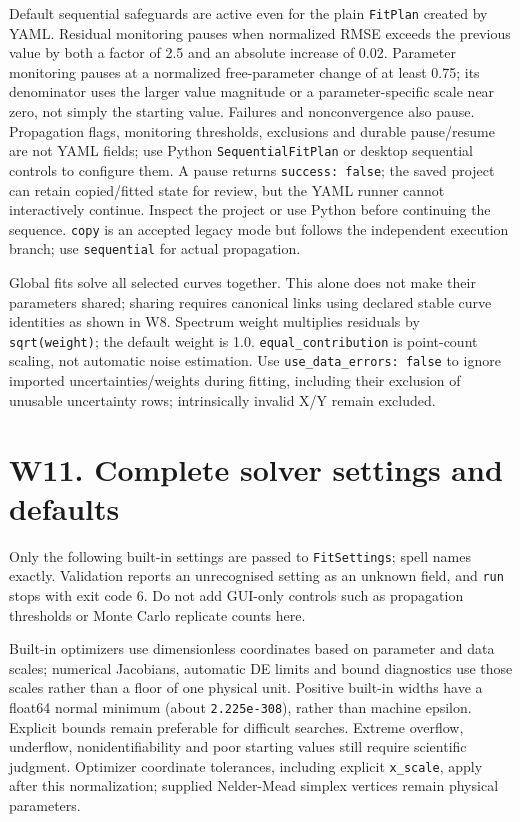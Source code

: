 \documentclass[
  10pt,
  a4paper,
  oneside]{scrreprt}
\begin{document}
Default sequential safeguards are active even for the plain
\texttt{FitPlan} created by YAML. Residual monitoring pauses when
normalized RMSE exceeds the previous value by both a factor of 2.5 and
an absolute increase of 0.02. Parameter monitoring pauses at a
normalized free-parameter change of at least 0.75; its denominator uses
the larger value magnitude or a parameter-specific scale near zero, not
simply the starting value. Failures and nonconvergence also pause.
Propagation flags, monitoring thresholds, exclusions and durable
pause/resume are not YAML fields; use Python \texttt{SequentialFitPlan}
or desktop sequential controls to configure them. A pause returns
\texttt{success:\ false}; the saved project can retain copied/fitted
state for review, but the YAML runner cannot interactively continue.
Inspect the project or use Python before continuing the sequence.
\texttt{copy} is an accepted legacy mode but follows the independent
execution branch; use \texttt{sequential} for actual propagation.

Global fits solve all selected curves together. This alone does not make
their parameters shared; sharing requires canonical links using declared
stable curve identities as shown in W8. Spectrum weight multiplies
residuals by \texttt{sqrt(weight)}; the default weight is 1.0.
\texttt{equal\_contribution} is point-count scaling, not automatic noise
estimation. Use \texttt{use\_data\_errors:\ false} to ignore imported
uncertainties/weights during fitting, including their exclusion of
unusable uncertainty rows; intrinsically invalid X/Y remain excluded.

\hypertarget{w11.-complete-solver-settings-and-defaults}{%
\section{W11. Complete solver settings and
defaults}\label{w11.-complete-solver-settings-and-defaults}}

Only the following built-in settings are passed to \texttt{FitSettings};
spell names exactly. Validation reports an unrecognised setting as an
unknown field, and \texttt{run} stops with exit code 6. Do not add
GUI-only controls such as propagation thresholds or Monte Carlo
replicate counts here.

Built-in optimizers use dimensionless coordinates based on parameter and
data scales; numerical Jacobians, automatic DE limits and bound
diagnostics use those scales rather than a floor of one physical unit.
Positive built-in widths have a float64 normal minimum (about
\texttt{2.225e-308}), rather than machine epsilon. Explicit bounds
remain preferable for difficult searches. Extreme overflow, underflow,
nonidentifiability and poor starting values still require scientific
judgment. Optimizer coordinate tolerances, including explicit
\texttt{x\_scale}, apply after this normalization; supplied Nelder-Mead
simplex vertices remain physical parameters.
\end{document}
